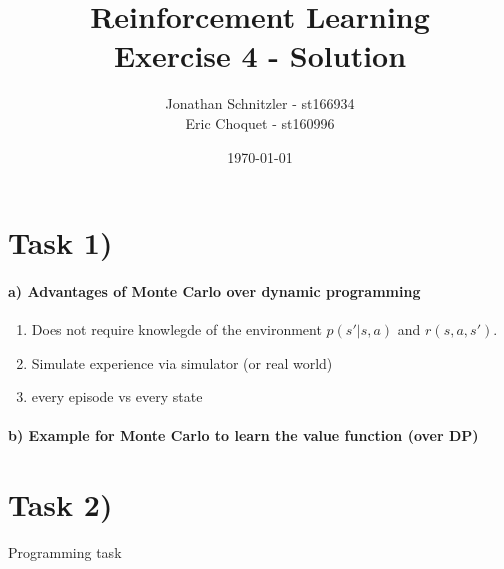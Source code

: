 \documentclass{article}
\title{Reinforcement Learning \\ Exercise 4 - Solution}
\author{Jonathan Schnitzler - st166934 \\
Eric Choquet - st160996}
\date{\today}
\begin{document}
\maketitle
\section*{Task 1)}


\paragraph*{a) Advantages of Monte Carlo over dynamic programming}

\begin{enumerate}
    \item Does not require knowlegde of the environment $p(s'| s,a)$ and $r(s,a,s')$.
    \item Simulate experience via simulator (or real world)
    \item every episode vs every state
\end{enumerate}

\paragraph*{b) Example for Monte Carlo to learn the value function (over DP)}




\section*{Task 2)}

Programming task
\end{document}

